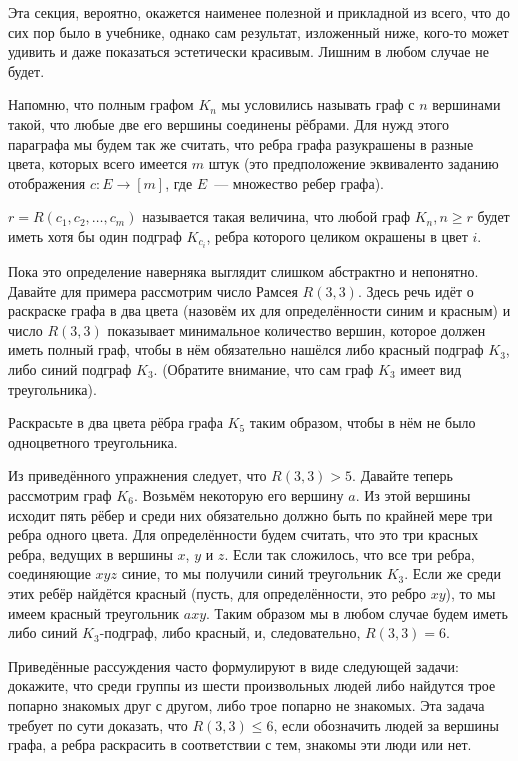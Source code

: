 Эта секция, вероятно, окажется наименее полезной и прикладной из всего, что до сих пор было в учебнике, однако сам результат, изложенный ниже, кого-то может удивить и даже показаться эстетически красивым. Лишним в любом случае не будет.

Напомню, что полным графом $K_n$ мы условились называть граф с $n$ вершинами такой, что любые две его вершины соединены рёбрами. Для нужд этого параграфа мы будем так же считать, что ребра графа разукрашены в разные цвета, которых всего имеется $m$ штук (это предположение эквиваленто заданию отображения $c:E\to[m]$, где $E$~--- множество ребер графа).

\begin{definition}
 $r = R(c_1, c_2, \ldots, c_m)$ называется такая величина, что любой граф $K_n, n\ge r$ будет иметь хотя бы один подграф $K_{c_i}$, ребра которого целиком окрашены в цвет $i$.
\end{definition}

Пока это определение наверняка выглядит слишком абстрактно и непонятно. Давайте для примера рассмотрим число Рамсея $R(3, 3)$. Здесь речь идёт о раскраске графа в два цвета (назовём их для определённости синим и красным) и число $R(3, 3)$ показывает минимальное количество вершин, которое должен иметь полный граф, чтобы в нём обязательно нашёлся либо красный подграф $K_3$, либо синий подграф $K_3$. (Обратите внимание, что сам граф $K_3$ имеет вид треугольника).

\begin{exercise}
Раскрасьте в два цвета рёбра графа $K_5$ таким образом, чтобы в нём не было одноцветного треугольника.
\end{exercise}

Из приведённого упражнения следует, что $R(3,3)>5$. Давайте теперь рассмотрим граф $K_6$. Возьмём некоторую его вершину $a$. Из этой вершины исходит пять рёбер и среди них обязательно должно быть по крайней мере три ребра одного цвета. Для определённости будем считать, что это три красных ребра, ведущих в вершины $x$, $y$ и $z$. Если так сложилось, что все три ребра, соединяющие $xyz$ синие, то мы получили синий треугольник $K_3$. Если же среди этих ребёр найдётся красный (пусть, для определённости, это ребро $xy$), то мы имеем красный треугольник $axy$. Таким образом мы в любом случае будем иметь либо синий $K_3$-подграф, либо красный, и, следовательно, $R(3, 3) = 6$.

Приведённые рассуждения часто формулируют в виде следующей задачи: докажите, что среди группы из шести произвольных людей либо найдутся трое попарно знакомых друг с другом, либо трое попарно не знакомых. Эта задача требует по сути доказать, что $R(3, 3) \le 6$, если обозначить людей за вершины графа, а ребра раскрасить в соответствии с тем, знакомы эти люди или нет.

